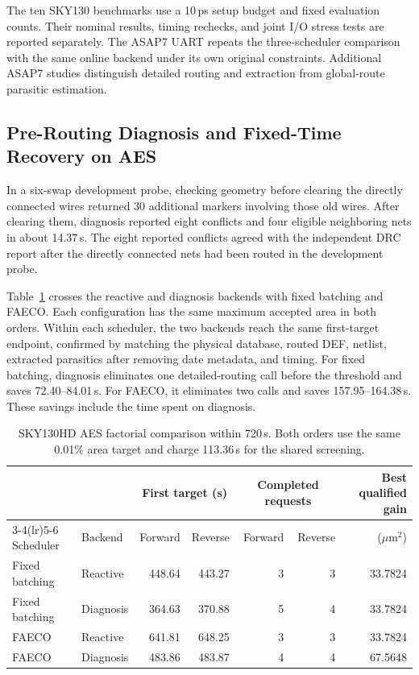 \documentclass[journal]{IEEEtran}
\newcommand{\um}{\ensuremath{\mu\mathrm{m}^{2}}}
\begin{document}
The ten SKY130 benchmarks use a 10\,ps setup budget and fixed evaluation counts. Their nominal results, timing rechecks, and joint I/O stress tests are reported separately. The ASAP7 UART repeats the three-scheduler comparison with the same online backend under its own original constraints. Additional ASAP7 studies distinguish detailed routing and extraction from global-route parasitic estimation.

\subsection{Pre-Routing Diagnosis and Fixed-Time Recovery on AES}
\label{sec:aes}

In a six-swap development probe, checking geometry before clearing the directly connected wires returned 30 additional markers involving those old wires. After clearing them, diagnosis reported eight conflicts and four eligible neighboring nets in about 14.37\,s. The eight reported conflicts agreed with the independent DRC report after the directly connected nets had been routed in the development probe.

Table~\ref{tab:aes_factorial} crosses the reactive and diagnosis backends with fixed batching and FAECO. Each configuration has the same maximum accepted area in both orders. Within each scheduler, the two backends reach the same first-target endpoint, confirmed by matching the physical database, routed DEF, netlist, extracted parasitics after removing date metadata, and timing. For fixed batching, diagnosis eliminates one detailed-routing call before the threshold and saves 72.40--84.01\,s. For FAECO, it eliminates two calls and saves 157.95--164.38\,s. These savings include the time spent on diagnosis.

\begin{table}[t]
\centering
\caption{SKY130HD AES factorial comparison within 720\,s. Both orders use the same 0.01\% area target and charge 113.36\,s for the shared screening.}
\label{tab:aes_factorial}
\footnotesize
\begin{tabular}{llrrrrr}
\toprule
& & \multicolumn{2}{c}{First target (s)} & \multicolumn{2}{c}{Completed requests} & Best qualified gain\\
\cmidrule(lr){3-4}\cmidrule(lr){5-6}
Scheduler & Backend & Forward & Reverse & Forward & Reverse & (\um)\\
\midrule
Fixed batching & Reactive & 448.64 & 443.27 & 3 & 3 & 33.7824\\
Fixed batching & Diagnosis & 364.63 & 370.88 & 5 & 4 & 33.7824\\
FAECO & Reactive & 641.81 & 648.25 & 3 & 3 & 33.7824\\
FAECO & Diagnosis & 483.86 & 483.87 & 4 & 4 & 67.5648\\
\bottomrule
\end{tabular}
\end{table}
\end{document}
